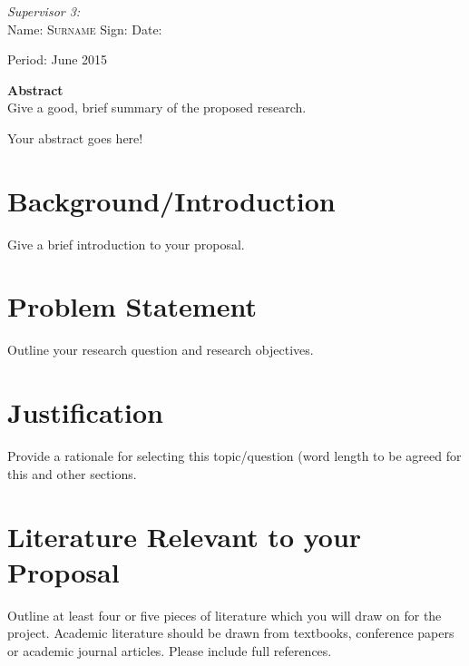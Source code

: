 \documentclass[12pt,svgnames,smaller]{article} %
\begin{document}
\begin{titlepage}
\begin{minipage}{1.0\textwidth}
\begin{flushleft} \large
\emph{Supervisor 3:} \\
Name: \hrulefill \textsc{ Surname} Sign: \hrulefill Date: \hrulefill
\end{flushleft}
\end{minipage}

\vfill
\begin{center}
{\large Period: June 2015}
\end{center}
\end{titlepage}


\textbf{Abstract}\\
Give a good, brief summary of the proposed research.

Your abstract goes here!

\clearpage
\tableofcontents
\clearpage

\section{\textbf{Background/Introduction}} Give a brief introduction to your proposal.
\section{\textbf{Problem Statement}} Outline your research question and research objectives.
\section{\textbf{Justification}} Provide a rationale for selecting this topic/question (word length to be agreed for this and other sections.
\section{\textbf{Literature Relevant to your Proposal}} Outline at least four or five pieces of literature which you will draw on for the project. Academic literature should be drawn from textbooks, conference papers or academic journal articles. Please include full references.
\end{document}
